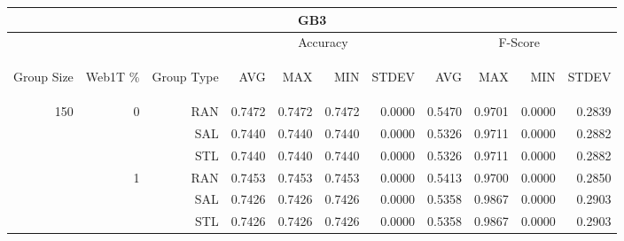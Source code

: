 \begin{center}
\begin{table}[htbp] 
 \begin{center}
\begin{tabular}{ | r | r | r | r | r | r | r | r | r | r | r |}
\hline
\multicolumn{11}{|c|}{GB3}\\
\hline
 & & & \multicolumn{4}{|c|}{Accuracy} & \multicolumn{4}{|c|}{F-Score}\\ \cline{4-11}
\begin{sideways}Group Size\end{sideways} & \begin{sideways}Web1T \%\end{sideways} & \begin{sideways}Group Type\end{sideways} & \begin{sideways}AVG\end{sideways} & \begin{sideways}MAX\end{sideways} & \begin{sideways}MIN\end{sideways} & \begin{sideways}STDEV\end{sideways} & \begin{sideways}AVG\end{sideways} & \begin{sideways}MAX\end{sideways} & \begin{sideways}MIN\end{sideways} & \begin{sideways}STDEV\end{sideways}\\
\hline
\multirow{9}{*}{150}
 & \multirow{3}{*}{0} & RAN & 0.7472 & 0.7472 & 0.7472 & 0.0000 & 0.5470 & 0.9701 & 0.0000 & 0.2839\\ \cline{3-11}
 &   & SAL & 0.7440 & 0.7440 & 0.7440 & 0.0000 & 0.5326 & 0.9711 & 0.0000 & 0.2882\\ \cline{3-11}
 &   & STL & 0.7440 & 0.7440 & 0.7440 & 0.0000 & 0.5326 & 0.9711 & 0.0000 & 0.2882\\ \cline{2-11}
 & \multirow{3}{*}{1} & RAN & 0.7453 & 0.7453 & 0.7453 & 0.0000 & 0.5413 & 0.9700 & 0.0000 & 0.2850\\ \cline{3-11}
 &   & SAL & 0.7426 & 0.7426 & 0.7426 & 0.0000 & 0.5358 & 0.9867 & 0.0000 & 0.2903\\ \cline{3-11}
 &   & STL & 0.7426 & 0.7426 & 0.7426 & 0.0000 & 0.5358 & 0.9867 & 0.0000 & 0.2903\\ \cline{2-11}

\end{tabular}
\end{center}
\end{table}
\end{center}
